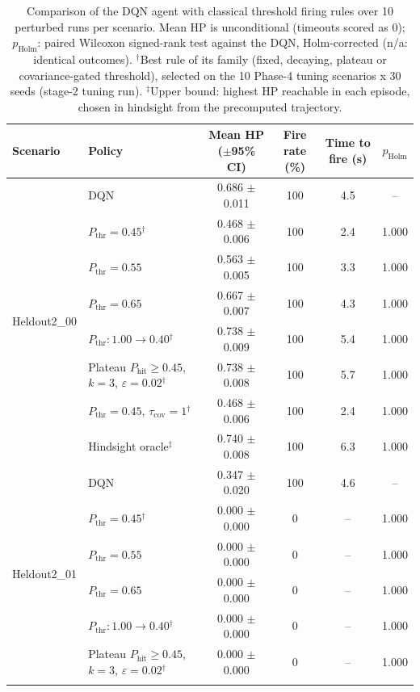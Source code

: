 \begin{table}[htbp]
\centering
\caption{Comparison of the DQN agent with classical threshold firing rules over 10 perturbed runs per scenario. Mean HP is unconditional (timeouts scored as 0); $p_{\mathrm{Holm}}$: paired Wilcoxon signed-rank test against the DQN, Holm-corrected (n/a: identical outcomes). $^{\dagger}$Best rule of its family (fixed, decaying, plateau or covariance-gated threshold), selected on the 10 Phase-4 tuning scenarios x 30 seeds (stage-2 tuning run). $^{\ddagger}$Upper bound: highest HP reachable in each episode, chosen in hindsight from the precomputed trajectory.}
\label{tab:comparison-traditional-rl}
\small
\begin{tabular}{llcccc}
\toprule
\textbf{Scenario} & \textbf{Policy} & \textbf{Mean HP ($\pm$95\% CI)} & \textbf{Fire rate (\%)} & \textbf{Time to fire (s)} & $p_{\mathrm{Holm}}$ \\
\midrule
\multirow{8}{*}{Heldout2\_00} & DQN & 0.686 $\pm$ 0.011 & 100 & 4.5 & -- \\
 & $P_{\mathrm{thr}}=0.45$$^{\dagger}$ & 0.468 $\pm$ 0.006 & 100 & 2.4 & 1.000 \\
 & $P_{\mathrm{thr}}=0.55$ & 0.563 $\pm$ 0.005 & 100 & 3.3 & 1.000 \\
 & $P_{\mathrm{thr}}=0.65$ & 0.667 $\pm$ 0.007 & 100 & 4.3 & 1.000 \\
 & $P_{\mathrm{thr}}: 1.00 \to 0.40$$^{\dagger}$ & 0.738 $\pm$ 0.009 & 100 & 5.4 & 1.000 \\
 & Plateau $P_{\mathrm{hit}}\geq0.45$, $k=3$, $\varepsilon=0.02$$^{\dagger}$ & 0.738 $\pm$ 0.008 & 100 & 5.7 & 1.000 \\
 & $P_{\mathrm{thr}}=0.45$, $\tau_{\mathrm{cov}}=1$$^{\dagger}$ & 0.468 $\pm$ 0.006 & 100 & 2.4 & 1.000 \\
 & Hindsight oracle$^{\ddagger}$ & 0.740 $\pm$ 0.008 & 100 & 6.3 & 1.000 \\
\midrule
\multirow{8}{*}{Heldout2\_01} & DQN & 0.347 $\pm$ 0.020 & 100 & 4.6 & -- \\
 & $P_{\mathrm{thr}}=0.45$$^{\dagger}$ & 0.000 $\pm$ 0.000 & 0 & -- & 1.000 \\
 & $P_{\mathrm{thr}}=0.55$ & 0.000 $\pm$ 0.000 & 0 & -- & 1.000 \\
 & $P_{\mathrm{thr}}=0.65$ & 0.000 $\pm$ 0.000 & 0 & -- & 1.000 \\
 & $P_{\mathrm{thr}}: 1.00 \to 0.40$$^{\dagger}$ & 0.000 $\pm$ 0.000 & 0 & -- & 1.000 \\
 & Plateau $P_{\mathrm{hit}}\geq0.45$, $k=3$, $\varepsilon=0.02$$^{\dagger}$ & 0.000 $\pm$ 0.000 & 0 & -- & 1.000 \\
$$
\end{tabular}
\end{table}
